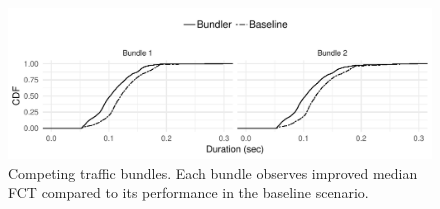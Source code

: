 \begin{figure}
    \centering
\begin{knitrout}
\color{fgcolor}
\includegraphics[width=\maxwidth]{figure/robust:twobundler-1} 

\end{knitrout}
    \caption{Competing traffic bundles. Each bundle observes improved median FCT compared to its performance in the baseline scenario.}
    \label{fig:robust:twobundler}
\end{figure}
